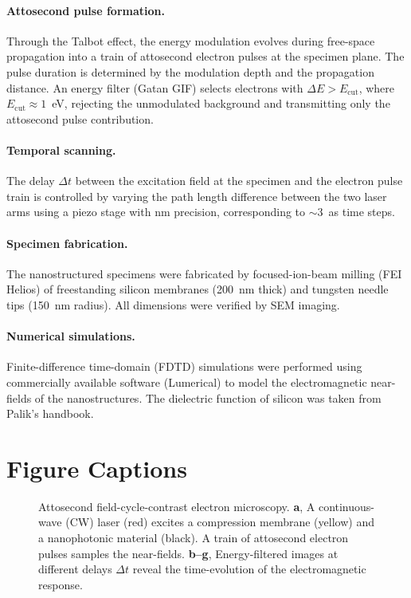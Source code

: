 \documentclass[12pt]{article}
\begin{document}
\paragraph{Attosecond pulse formation.} Through the Talbot effect, the energy modulation evolves during free-space propagation into a train of attosecond electron pulses at the specimen plane. The pulse duration is determined by the modulation depth and the propagation distance. An energy filter (Gatan GIF) selects electrons with $\Delta E > E_\text{cut}$, where $E_\text{cut} \approx 1$~eV, rejecting the unmodulated background and transmitting only the attosecond pulse contribution.

\paragraph{Temporal scanning.} The delay $\Delta t$ between the excitation field at the specimen and the electron pulse train is controlled by varying the path length difference between the two laser arms using a piezo stage with nm precision, corresponding to ${\sim}3$~as time steps.

\paragraph{Specimen fabrication.} The nanostructured specimens were fabricated by focused-ion-beam milling (FEI Helios) of freestanding silicon membranes (200~nm thick) and tungsten needle tips (150~nm radius). All dimensions were verified by SEM imaging.

\paragraph{Numerical simulations.} Finite-difference time-domain (FDTD) simulations were performed using commercially available software (Lumerical) to model the electromagnetic near-fields of the nanostructures. The dielectric function of silicon was taken from Palik's handbook.

\section*{Figure Captions}

\begin{figure}[htbp]
    \centering
    \caption{Attosecond field-cycle-contrast electron microscopy. \textbf{a}, A continuous-wave (CW) laser (red) excites a compression membrane (yellow) and a nanophotonic material (black). A train of attosecond electron pulses samples the near-fields. \textbf{b--g}, Energy-filtered images at different delays $\Delta t$ reveal the time-evolution of the electromagnetic response.}
    \label{fig:concept}
\end{figure}
\end{document}
